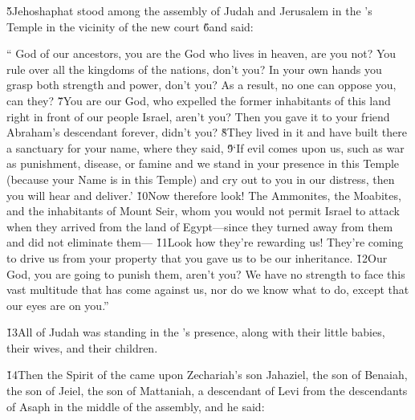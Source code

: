 \v{5}Jehoshaphat stood among the assembly of Judah and Jerusalem in the 's Temple in the vicinity of the new court \v{6}and said:

\begin{poetry}
\poeml `` God of our ancestors, you are the God who lives in heaven, are you not? You rule over all the kingdoms of the nations, don't you? In your own hands you grasp both strength and power, don't you? As a result, no one can oppose you, can they? \v{7}You are our God, who expelled the former inhabitants of this land right in front of our people Israel, aren't you? Then you gave it to your friend Abraham's descendant forever, didn't you? \v{8}They lived in it and have built there a sanctuary for your name, where they said, \v{9}`If evil comes upon us, such as war as punishment, disease, or famine and we stand in your presence in this Temple (because your Name is in this Temple) and cry out to you in our distress, then you will hear and deliver.' \v{10}Now therefore look! The Ammonites, the Moabites, and the inhabitants of Mount Seir, whom you would not permit Israel to attack when they arrived from the land of Egypt---since they turned away from them and did not eliminate them--- \v{11}Look how they're rewarding us! They're coming to drive us from your property that you gave us to be our inheritance. \v{12}Our God, you are going to punish them, aren't you? We have no strength to face this vast multitude that has come against us, nor do we know what to do, except that our eyes are on you.''
\end{poetry}

\v{13}All of Judah was standing in the 's presence, along with their little babies, their wives, and their children.

\v{14}Then the Spirit of the  came upon Zechariah's son Jahaziel, the son of Benaiah, the son of Jeiel, the son of Mattaniah, a descendant of Levi from the descendants of Asaph in the middle of the assembly, and he said:

